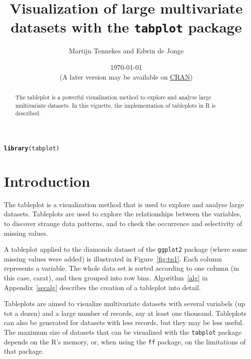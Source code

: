 \documentclass[11pt, fleqn, a4paper]{article}\usepackage{graphicx, color}
\title{Visualization of large multivariate datasets with the {\tt tabplot} package}
\author{Martijn Tennekes and Edwin de Jonge}
\date{\today\\ (A later version may be available on \href{http://cran.r-project.org/package=tabplot}{CRAN})}
\makeatletter
\newcommand{\hlfunctioncall}[1]{\textcolor[rgb]{0.501960784313725,0,0.329411764705882}{\textbf{#1}}}%
\newenvironment{kframe}{%
 \def\FrameCommand##1{\hskip\@totalleftmargin \hskip-\fboxsep
 \colorbox{shadecolor}{##1}\hskip-\fboxsep
     \hskip-\linewidth \hskip-\@totalleftmargin \hskip\columnwidth}%
 \MakeFramed {\advance\hsize-\width
   \@totalleftmargin\z@ \linewidth\hsize
   \@setminipage}}%
 {\par\unskip\endMakeFramed}
\newenvironment{knitrout}{}{} %
\makeatother
\begin{document}

\maketitle
\begin{abstract}

The tableplot is a powerful visualization method to explore and analyse large multivariate datasets. In this vignette, the implementation of tableplots in R is described. 


\end{abstract}

\begin{knitrout}
\color{fgcolor}\begin{kframe}
\begin{alltt}
\hlfunctioncall{library}(tabplot)
\end{alltt}
\end{kframe}
\end{knitrout}

\maketitle


\section{Introduction}
The tableplot is a visualization method that is used to explore and analyse large datasets. Tableplots are used to explore the relationships between the variables, to discover strange data patterns, and to check the occurrence and selectivity of missing values. 

A tableplot applied to the diamonds dataset of the {\tt ggplot2} package (where some missing values were added) is illustrated in Figure~\ref{fig:tp1}. Each column represents a variable. The whole data set is sorted according to one column (in this case, carat), and then grouped into row bins. Algorithm~\ref{alg} in Appendix~\ref{secalg} describes the creation of a tableplot into detail.

Tableplots are aimed to visualize multivariate datasets with several variabels (up tot a dozen) and a large number of records, say at least one thousand. Tableplots can also be generated for datasets with less records, but they may be less useful. The maximum size of datasets that can be visualized with the {\tt tabplot} package depends on the R's memory, or, when using the {\tt ff} package, on the limitations of that package.
\end{document}
